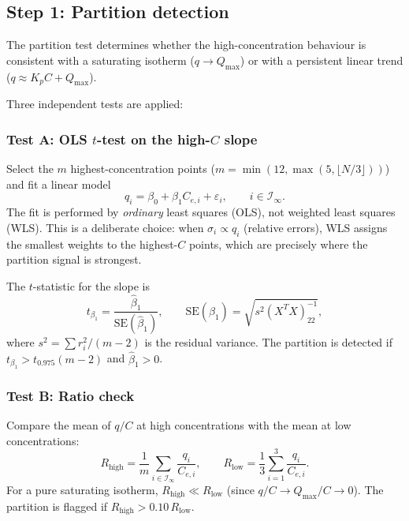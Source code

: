 \documentclass[12pt]{article}
\begin{document}
\subsection{Step 1: Partition detection}

The partition test determines whether the high-concentration behaviour
is consistent with a saturating isotherm ($q \to Q_{\max}$) or with
a persistent linear trend ($q \approx K_p C + Q_{\max}$).

Three independent tests are applied:

\subsubsection{Test A: OLS $t$-test on the high-$C$ slope}

Select the $m$ highest-concentration points ($m = \min(12, \max(5,
\lfloor N/3\rfloor))$) and fit a linear model
\begin{equation}
  q_i = \beta_0 + \beta_1 C_{e,i} + \varepsilon_i,
  \qquad i \in \mathcal{I}_{\infty}.
  \label{eq:partition_linear}
\end{equation}
The fit is performed by \emph{ordinary} least squares (OLS),
not weighted least squares (WLS).  This is a deliberate choice:
when $\sigma_i \propto q_i$ (relative errors), WLS assigns the
smallest weights to the highest-$C$ points, which are precisely
where the partition signal is strongest.

The $t$-statistic for the slope is
\begin{equation}
  t_{\beta_1} = \frac{\hat{\beta}_1}{\mathrm{SE}(\hat{\beta}_1)},
  \qquad
  \mathrm{SE}(\hat{\beta}_1) = \sqrt{s^2 (X^T X)^{-1}_{22}},
  \label{eq:t_test_slope}
\end{equation}
where $s^2 = \sum r_i^2 / (m-2)$ is the residual variance.
The partition is detected if $t_{\beta_1} > t_{0.975}(m-2)$ and
$\hat{\beta}_1 > 0$.

\subsubsection{Test B: Ratio check}

Compare the mean of $q/C$ at high concentrations with the mean at
low concentrations:
\begin{equation}
  R_{\mathrm{high}} = \frac{1}{m}\sum_{i\in\mathcal{I}_\infty}
  \frac{q_i}{C_{e,i}},
  \qquad
  R_{\mathrm{low}} = \frac{1}{3}\sum_{i=1}^{3}
  \frac{q_i}{C_{e,i}}.
  \label{eq:ratio_check}
\end{equation}
For a pure saturating isotherm, $R_{\mathrm{high}} \ll R_{\mathrm{low}}$
(since $q/C \to Q_{\max}/C \to 0$).  The partition is flagged if
$R_{\mathrm{high}} > 0.10\,R_{\mathrm{low}}$.
\end{document}
